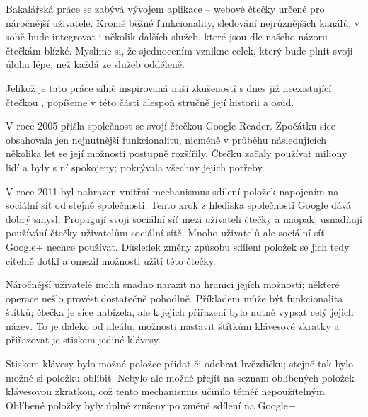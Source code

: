 
Bakalářská práce se zabývá vývojem aplikace -- webové čtečky určené pro náročnější uživatele.
Kromě běžné funkcionality, sledování nejrůznějších  kanálů, v sobě bude integrovat i několik dalších služeb, které jsou dle našeho názoru čtečkám blízké.
Myslíme si, že sjednocením vznikne celek, který bude plnit svoji úlohu lépe, než každá ze služeb odděleně.


Jelikož je tato práce silně inspirovaná naší zkušeností s dnes již neexistující čtečkou , popíšeme v této části alespoň stručně její historii a osud.


V roce 2005 přišla společnost  se svojí čtečkou Google Reader.
Zpočátku sice obsahovala jen nejnutnější funkcionalitu, nicméně v průběhu následujících několika let se její možnosti postupně rozšířily.
Čtečku začaly používat miliony lidí a byly s ní spokojeny; pokrývala všechny jejich potřeby.

V roce 2011 byl nahrazen vnitřní mechanismus sdílení položek napojením na sociální síť  od stejné společnosti.
Tento krok z hlediska společnosti \mbox{Google} dává dobrý smysl.
Propagují svoji sociální síť mezi uživateli čtečky a naopak, usnadňují používání čtečky uživatelům sociální sítě.
Mnoho uživatelů ale sociální síť Google+ nechce používat.
Důsledek změny způsobu sdílení položek se jich tedy citelně dotkl a omezil možnosti užití této čtečky.

Náročnější uživatelé mohli snadno narazit na hranici jejích možností; některé operace nešlo provést dostatečně pohodlně.
Příkladem může být funkcionalita štítků; čtečka je sice nabízela, ale k jejich přiřazení bylo nutné vypsat celý jejich název.
To je daleko od ideálu, možnosti nastavit štítkům klávesové zkratky a přiřazovat je stiskem jediné klávesy.

Stiskem klávesy bylo možné položce přidat či odebrat hvězdičku; stejně tak bylo možné si položku oblíbit.
Nebylo ale možné přejít na seznam oblíbených položek klávesovou zkratkou, což tento mechanismus učinilo téměř nepoužitelným.
Oblíbené položky byly úplně zrušeny po změně sdílení na Google+.

